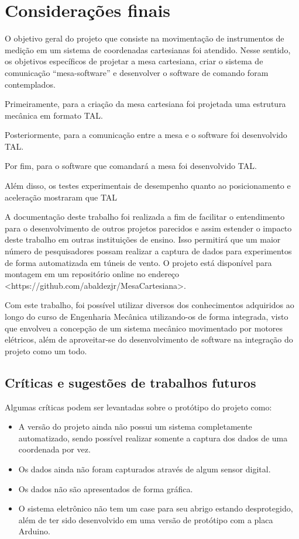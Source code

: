 \chapter{Considerações finais}
\label{chap:conclusao}

O objetivo geral do projeto que consiste na movimentação de instrumentos de medição em um sistema 
de coordenadas cartesianas foi atendido. Nesse sentido, os objetivos específicos de projetar a 
mesa cartesiana, criar o sistema de comunicação “mesa-software” e desenvolver o software 
de comando foram contemplados.

Primeiramente, para a criação da mesa cartesiana foi projetada uma estrutura mecânica em formato TAL.

Posteriormente, para a comunicação entre a mesa e o software foi desenvolvido TAL.

Por fim, para o software que comandará a mesa foi desenvolvido TAL.

Além disso, os testes experimentais de desempenho quanto ao posicionamento e aceleração mostraram que TAL

A documentação deste trabalho foi realizada a fim de facilitar o entendimento para o desenvolvimento de 
outros projetos parecidos e assim estender o impacto deste trabalho em outras instituições de ensino. 
Isso permitirá que um maior número de pesquisadores possam realizar a captura de dados para experimentos 
de forma automatizada em túneis de vento. O projeto está disponível para montagem em um repositório online 
no endereço <https://github.com/abaldezjr/MesaCartesiana>.

Com este trabalho, foi possível utilizar diversos dos conhecimentos adquiridos ao longo do curso de 
Engenharia Mecânica utilizando-os de forma integrada, visto que envolveu a concepção de um sistema 
mecânico movimentado por motores elétricos, além de aproveitar-se do desenvolvimento de software 
na integração do projeto como um todo.

\section{Críticas e sugestões de trabalhos futuros}\label{sec:criticas}

Algumas críticas podem ser levantadas sobre o protótipo do projeto como:

\begin{itemize}
    \item A versão do projeto ainda não possui um sistema completamente automatizado, sendo possível realizar somente a captura dos dados de uma coordenada por vez.
    \item Os dados ainda não foram capturados através de algum sensor digital.
    \item Os dados não são apresentados de forma gráfica.
    \item O sistema eletrônico não tem um case para seu abrigo estando desprotegido, além de ter sido desenvolvido em uma versão de protótipo com a placa Arduino. 
\end{itemize}

